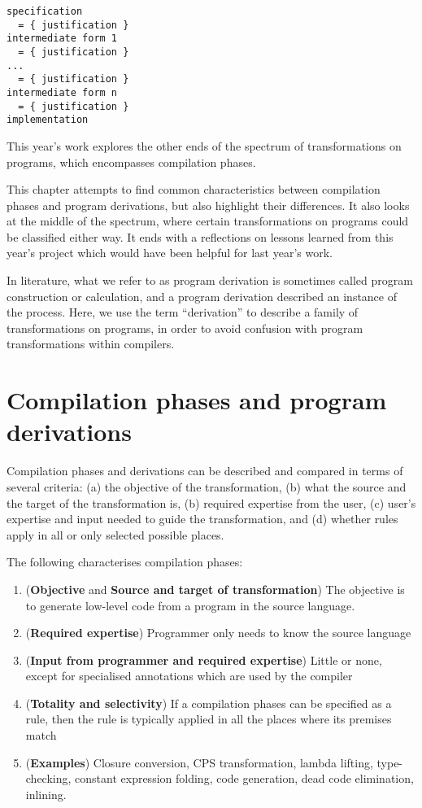 \documentclass[bsc,frontabs,oneside,singlespacing,parskip,deptreport]{infthesis}
\theoremstyle{definition}
\theoremstyle{lemma}
\begin{document}
\begin{verbatim}
specification
  = { justification }
intermediate form 1
  = { justification }
...
  = { justification }
intermediate form n
  = { justification }
implementation
\end{verbatim}

This year's work explores the other ends of the spectrum of
transformations on programs, which encompasses compilation
phases.

This chapter attempts to find common characteristics between
compilation phases and program derivations, but also highlight their
differences. It also looks at the middle of the spectrum, where
certain transformations on programs could be classified either way. It
ends with a reflections on lessons learned from this year's project
which would have been helpful for last year's work.

In literature, what we refer to as program derivation is sometimes
called program construction or calculation, and a program derivation
described an instance of the process. Here, we use the term
``derivation'' to describe a family of transformations on programs, in
order to avoid confusion with program transformations within compilers.

\section{Compilation phases and program derivations}
\label{sec:comp-phas-progr}

Compilation phases and derivations can be described and compared in
terms of several criteria: (a) the objective of the transformation,
(b) what the source and the target of the transformation is, (b)
required expertise from the user, (c) user's expertise and input
needed to guide the transformation, and (d) whether rules apply in all or
only selected possible places.

The following characterises compilation phases:

\begin{enumerate}
\item (\textbf{Objective} and \textbf{Source and target of
    transformation}) The objective is to generate low-level code from
  a program in the source language.
\item (\textbf{Required expertise}) Programmer only needs to know the
  source language
\item (\textbf{Input from programmer and required expertise}) Little or none, except for
  specialised annotations which are used by the compiler
\item (\textbf{Totality and selectivity}) If a compilation phases can
  be specified as a rule, then the rule is typically applied in all
  the places where its premises match
\item (\textbf{Examples}) Closure conversion, CPS transformation,
  lambda lifting, type-checking, constant expression folding, code
  generation, dead code elimination, inlining.
\end{enumerate}
\end{document}
